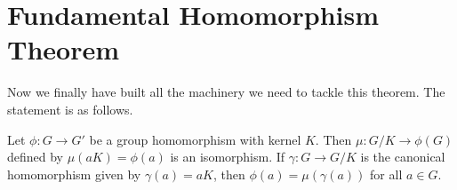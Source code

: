 \section{Fundamental Homomorphism Theorem}

Now we finally have built all the machinery we need to tackle this theorem. The statement is as follows.

\begin{theorem}
Let $\phi: G \to G'$ be a group homomorphism with kernel $K$. Then $\mu: G/K \to \phi(G)$ defined by $\mu(aK) = \phi(a)$ is an isomorphism. If $\gamma: G \to G/K$ is the canonical homomorphism given by $\gamma(a) = aK$, then $\phi(a) = \mu(\gamma(a))$ for all $a \in G$.
\end{theorem}
